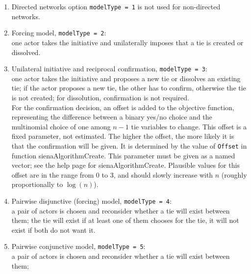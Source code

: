 \documentclass[a4paper,fleqn,11pt]{article}
\newcommand{\+}{\, + \,}
\begin{document}
\begin{enumerate}
\item Directed networks option \texttt{modelType = 1} is not used for non-directed networks.
\item Forcing model, \texttt{modelType = 2}: \\ %
      one actor takes the initiative and unilaterally
      imposes that a tie is created or dissolved.
\item Unilateral initiative and reciprocal confirmation,
      \texttt{modelType = 3}:\\ %
      one actor takes the initiative and proposes a new tie
      or dissolves an existing tie; if the actor proposes a new tie, the other
      has to confirm, otherwise the tie is not created;
      for dissolution, confirmation is not required.\\
      For the confirmation decision, an offset is added to the objective
      function, representing the difference between a binary yes/no choice
      and the multinomial choice of one among $n-1$ tie variables to change.
      This offset is a fixed parameter, not estimated.
      The higher the offset, the more likely it is that the confirmation
      will be given. It is determined
      by the value of \texttt{Offset} in function
      \textsf{sienaAlgorithmCreate}. This parameter must be given as a
      named vector; see the help page for \textsf{sienaAlgorithmCreate}.
      Plausible values for this offset are in the range from 0 to 3,
      and should slowly increase with $n$ (roughly proportionally to $\log(n)$).

\item Pairwise disjunctive (forcing) model, \texttt{modelType = 4}:\\ %
      a pair of actors is chosen and reconsider
      whether a tie will exist between them;
      the tie will exist if at least one of them chooses for the tie,
      it will not exist if both do not want it.
\item Pairwise conjunctive model, \texttt{modelType = 5}:\\  %
      a pair of actors is chosen and reconsider
      whether a tie will exist between them;

\end{enumerate}
\end{document}
